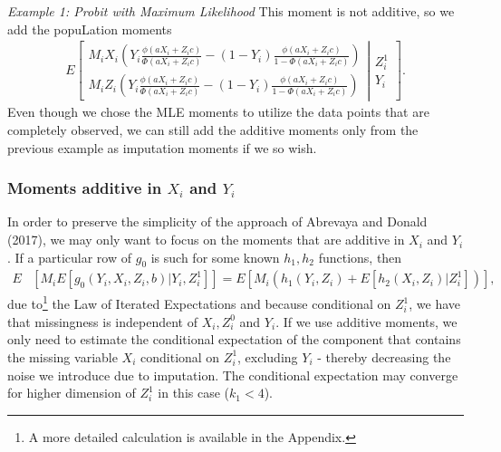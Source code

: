 \documentclass{article}
\theoremstyle{definition}
\theoremstyle{remark}
\begin{document}
\emph{Example 1: Probit with Maximum Likelihood}
This moment is not additive, so we add the popuLation moments
\begin{align*}
E\left[\left.\begin{array}{c}
M_i X_i\left(Y_i \frac{\phi(aX_i+Z_ic)}{\Phi(aX_i+Z_ic)} - (1-Y_i)\frac{\phi(aX_i+Z_ic)}{1-\Phi(aX_i+Z_ic)}\right) \\
M_i Z_i\left(Y_i \frac{\phi(aX_i+Z_ic)}{\Phi(aX_i+Z_ic)} - (1-Y_i)\frac{\phi(aX_i+Z_ic)}{1-\Phi(aX_i+Z_ic)}\right)
\end{array}
\right| \begin{array}{c} Z_i^1 \\ Y_i \end{array}\right].
\end{align*}
Even though we chose the MLE moments to utilize the data points that are completely observed, we can still add the additive moments only from the previous example as imputation moments if we so wish.

\subsubsection{Moments additive in $X_i$ and $Y_i$}
In order to preserve the simplicity of the approach of Abrevaya and Donald (2017), we  may only want to focus on the moments that are additive in $X_i$ and $Y_i$. If a particular row of $g_0$ is such for some known $h_1,h_2$ functions, then
\begin{align}
E&[M_i E[g_0(Y_i,X_i,Z_i,b)|Y_i,Z_i^1]]= E\left[M_i (h_1(Y_i,Z_i) + E[h_2(X_i,Z_i)|Z^1_i])\right],
\end{align}
due to\footnote{A more detailed calculation is available in the Appendix.} the Law of Iterated Expectations and because conditional on $Z_i^1$, we have that missingness is independent of $X_i,Z_i^0$ and $Y_i$. If we use additive moments, we only need to estimate the conditional expectation of the component that contains the missing variable $X_i$ conditional on $Z_i^1$, excluding $Y_i$ - thereby decreasing the noise we introduce due to imputation. The conditional expectation may converge for higher dimension of $Z_i^1$ in this case ($k_1<4$).
\end{document}
